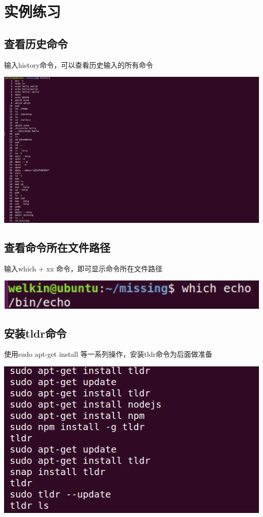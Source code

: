 \documentclass[UTF8,a4paper]{ctexart}
\begin{document}
\begin{sloppypar}
	
			\bigskip
			\bigskip
			\bigskip
			\bigskip
			
	
	\section{实例练习}
	\subsection{查看历史命令}
	输入history命令，可以查看历史输入的所有命令
	
	\includegraphics[width = 16cm]{1}
	
	\subsection{查看命令所在文件路径}
	输入which + xx 命令，即可显示命令所在文件路径
	
	\includegraphics[width = 16cm]{2}
	
	\subsection{安装tldr命令}
	使用sudo apt-get install 等一系列操作，安装tldr命令为后面做准备
	
	\includegraphics[width = 16cm]{3}
	

\end{sloppypar}
\end{document}
